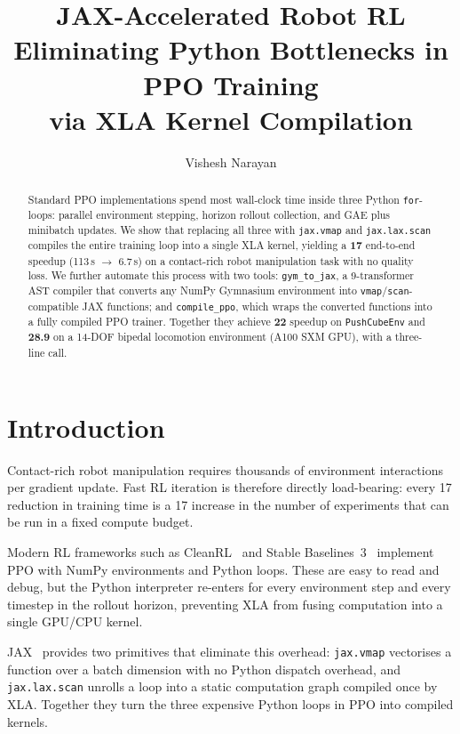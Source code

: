 \documentclass[11pt,twocolumn]{article}
\title{\textbf{JAX-Accelerated Robot RL}\\
  \large Eliminating Python Bottlenecks in PPO Training\\
  via XLA Kernel Compilation}
\author{Vishesh Narayan}
\date{}
\begin{document}
\maketitle

\begin{abstract}
Standard PPO implementations spend most wall-clock time inside three Python
\texttt{for}-loops: parallel environment stepping, horizon rollout collection,
and GAE plus minibatch updates. We show that replacing all three with
\texttt{jax.vmap} and \texttt{jax.lax.scan} compiles the entire training loop
into a single XLA kernel, yielding a
\textcolor{badge}{\textbf{17\texttimes{}}} end-to-end speedup (113\,s
$\to$ 6.7\,s) on a contact-rich robot manipulation task with no quality loss.
We further automate this process with two tools: \texttt{gym\_to\_jax}, a
9-transformer AST compiler that converts any NumPy Gymnasium environment into
\texttt{vmap}/\texttt{scan}-compatible JAX functions; and \texttt{compile\_ppo},
which wraps the converted functions into a fully compiled PPO trainer.
Together they achieve \textbf{22\texttimes{}} speedup on \texttt{PushCubeEnv}
and \textbf{28.9\texttimes{}} on a 14-DOF bipedal locomotion environment
(A100 SXM GPU), with a three-line call.
\end{abstract}

\section{Introduction}

Contact-rich robot manipulation requires thousands of environment interactions
per gradient update. Fast RL iteration is therefore directly load-bearing:
every 17\texttimes{} reduction in training time is a 17\texttimes{} increase
in the number of experiments that can be run in a fixed compute budget.

Modern RL frameworks such as CleanRL~\cite{huang2022cleanrl} and Stable
Baselines~3~\cite{raffin2021stable} implement PPO with NumPy environments and
Python loops. These are easy to read and debug, but the Python interpreter
re-enters for every environment step and every timestep in the rollout
horizon, preventing XLA from fusing computation into a single GPU/CPU kernel.

JAX~\cite{bradbury2018jax} provides two primitives that eliminate this
overhead: \texttt{jax.vmap} vectorises a function over a batch dimension with
no Python dispatch overhead, and \texttt{jax.lax.scan} unrolls a loop into a
static computation graph compiled once by XLA. Together they turn the three
expensive Python loops in PPO into compiled kernels.
\end{document}
